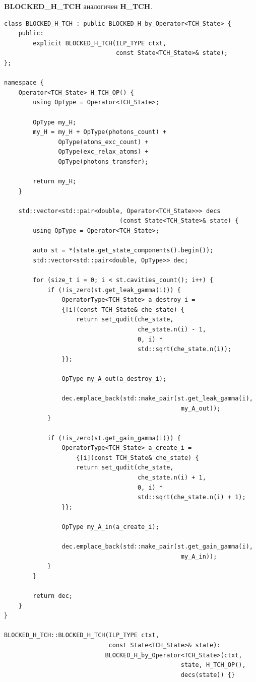 \documentclass[12pt,fleqn]{article}
\begin{document}
        \textbf{BLOCKED\_H\_TCH} аналогичен \textbf{H\_TCH}.
\begin{mdframed}[linecolor=black, topline=true, bottomline=true,
leftline=false, rightline=false]
\begin{verbatim}
class BLOCKED_H_TCH : public BLOCKED_H_by_Operator<TCH_State> {
    public:
        explicit BLOCKED_H_TCH(ILP_TYPE ctxt,
                               const State<TCH_State>& state);
};

namespace {
    Operator<TCH_State> H_TCH_OP() {
        using OpType = Operator<TCH_State>;

        OpType my_H;
        my_H = my_H + OpType(photons_count) + 
               OpType(atoms_exc_count) + 
               OpType(exc_relax_atoms) + 
               OpType(photons_transfer);

        return my_H;
    }
    
    std::vector<std::pair<double, Operator<TCH_State>>> decs
                                (const State<TCH_State>& state) {
        using OpType = Operator<TCH_State>;

        auto st = *(state.get_state_components().begin());
        std::vector<std::pair<double, OpType>> dec;

        for (size_t i = 0; i < st.cavities_count(); i++) {
            if (!is_zero(st.get_leak_gamma(i))) {
                OperatorType<TCH_State> a_destroy_i = 
                {[i](const TCH_State& che_state) {
                    return set_qudit(che_state, 
                                     che_state.n(i) - 1,
                                     0, i) * 
                                     std::sqrt(che_state.n(i));
                }};

                OpType my_A_out(a_destroy_i);

                dec.emplace_back(std::make_pair(st.get_leak_gamma(i),
                                                 my_A_out));
            }

            if (!is_zero(st.get_gain_gamma(i))) {
                OperatorType<TCH_State> a_create_i = 
                    {[i](const TCH_State& che_state) {
                    return set_qudit(che_state,
                                     che_state.n(i) + 1,
                                     0, i) * 
                                     std::sqrt(che_state.n(i) + 1);
                }};

                OpType my_A_in(a_create_i);

                dec.emplace_back(std::make_pair(st.get_gain_gamma(i),
                                                 my_A_in));
            }
        }

        return dec;
    }
}

BLOCKED_H_TCH::BLOCKED_H_TCH(ILP_TYPE ctxt,
                             const State<TCH_State>& state):
                            BLOCKED_H_by_Operator<TCH_State>(ctxt,
                                                 state, H_TCH_OP(),
                                                 decs(state)) {}
\end{verbatim}
\end{mdframed}
\end{document}
